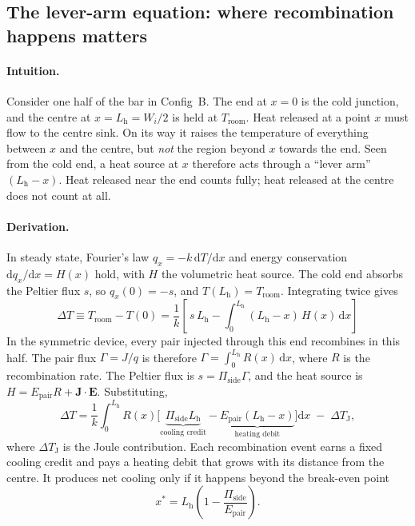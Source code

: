 \documentclass[11pt,a4paper]{article}
\newcommand{\Ep}{E_{\mathrm{pair}}}
\newcommand{\Pis}{\Pi_{\mathrm{side}}}
\newcommand{\Lh}{L_{\mathrm{h}}}
\newcommand{\Troom}{T_{\mathrm{room}}}
\newcommand{\dd}{\mathrm{d}}
\begin{document}
\subsection{The lever-arm equation: where recombination happens matters}
\paragraph{Intuition.} Consider one half of the bar in Config~B. The end at $x=0$ is the cold junction, and the centre at $x=\Lh=W_i/2$ is held at $\Troom$. Heat released at a point $x$ must flow to the centre sink. On its way it raises the temperature of everything between $x$ and the centre, but \emph{not} the region beyond $x$ towards the end. Seen from the cold end, a heat source at $x$ therefore acts through a ``lever arm'' $(\Lh-x)$. Heat released near the end counts fully; heat released at the centre does not count at all.

\paragraph{Derivation.} In steady state, Fourier's law $q_x=-k\,\dd T/\dd x$ and energy conservation $\dd q_x/\dd x=H(x)$ hold, with $H$ the volumetric heat source. The cold end absorbs the Peltier flux $s$, so $q_x(0)=-s$, and $T(\Lh)=\Troom$. Integrating twice gives
\begin{equation}
  \boxed{\;\Delta T \equiv \Troom - T(0) = \frac1k\left[\, s\,\Lh - \int_0^{\Lh}(\Lh-x)\,H(x)\,\dd x \right]\;} \label{eq:lever}
\end{equation}
In the symmetric device, every pair injected through this end recombines in this half. The pair flux $\Gamma=J/q$ is therefore $\Gamma=\int_0^{\Lh}R(x)\,\dd x$, where $R$ is the recombination rate. The Peltier flux is $s=\Pis\Gamma$, and the heat source is $H=\Ep R+\bm J\cdot\bm E$. Substituting,
\begin{equation}
  \Delta T = \frac1k\int_0^{\Lh} R(x)\Big[\underbrace{\Pis\Lh}_{\text{cooling credit}} - \underbrace{\Ep(\Lh-x)}_{\text{heating debit}}\Big]\dd x \;-\; \Delta T_{\mathrm{J}}, \label{eq:lever2}
\end{equation}
where $\Delta T_{\mathrm J}$ is the Joule contribution. Each recombination event earns a fixed cooling credit and pays a heating debit that grows with its distance from the centre. It produces net cooling only if it happens beyond the break-even point
\begin{equation}
  x^\ast = \Lh\left(1-\frac{\Pis}{\Ep}\right). \label{eq:xstar}
\end{equation}
\end{document}
